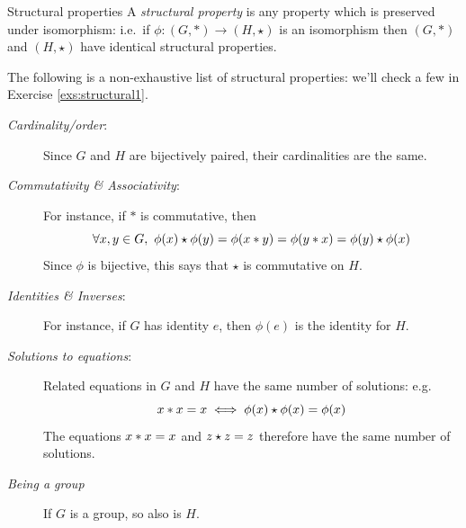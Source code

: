 \begin{defn}{Structural properties}{}
A \emph{structural property} is any property which is preserved under isomorphism: i.e.\ if $\phi:(G,*)\to (H,\star)$ is an isomorphism then $(G,*)$ and $(H,\star)$ have identical structural properties.
\end{defn}


The following is a non-exhaustive list of structural properties: we'll check a few in Exercise \ref{exs:structural1}.
\begin{description}
  \item[\normalfont\emph{Cardinality/order}:] Since $G$ and $H$ are bijectively paired, their cardinalities are the same.
  \item[\normalfont\emph{Commutativity \& Associativity}:] For instance, if $\ast$ is commutative, then
  \[\forall x,y\in G,\ \phi(x)\opstar\phi(y)=\phi(x\opast y)=\phi(y\opast x)=\phi(y)\opstar\phi(x)\]
  Since $\phi$ is bijective, this says that $\star$ is commutative on $H$.
  \item[\normalfont\emph{Identities \& Inverses}:] For instance, if $G$ has identity $e$, then $\phi(e)$ is the identity for $H$.
  \item[\normalfont\emph{Solutions to equations}:] Related equations in $G$ and $H$ have the same number of solutions: e.g.
  \[x\mathbin{\ast} x=x\iff \phi(x)\mathbin{\star}\phi(x)=\phi(x)\]
  The equations $x\mathbin{\ast} x=x$ and $z\mathbin{\star} z=z$ therefore have the same number of solutions.%
  \item[\normalfont\emph{Being a group}] If $G$ is a group, so also is $H$.
\end{description}


\goodbreak

